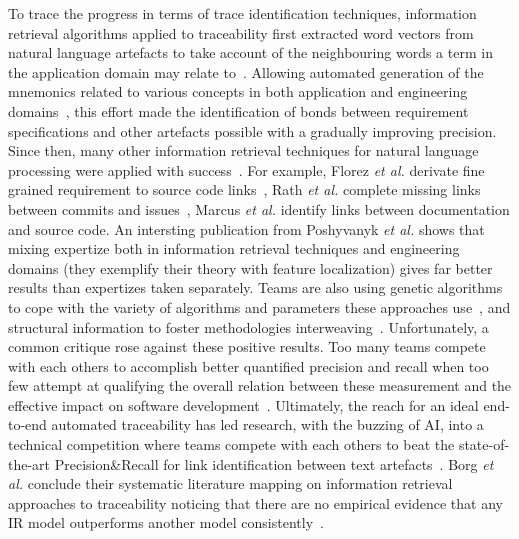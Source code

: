 To trace the progress in terms of trace identification techniques, information retrieval algorithms applied to traceability first extracted word vectors from natural language artefacts to take account of the neighbouring words a term in the application domain may relate to~\cite{delucia2012-information-retrieval-for-traceability}. Allowing automated generation of the mnemonics related to various concepts in both application and engineering domains~\cite{antoniol2002-tracing-code-documentation-links}, this effort made the identification of bonds between requirement specifications and other artefacts possible with a gradually improving precision. Since then, many other information retrieval techniques for natural language processing were applied with success~\cite{arunthavanathan2016-traceability-with-NLP}. For example, Florez \textit{et al.} derivate fine grained requirement to source code links~\cite{florez2019-finegrained-req2code}, Rath \textit{et al.} complete missing links between commits and issues~\cite{rath2018-guo-augmenting-incomplete-traces}, Marcus \textit{et al.} identify links between documentation and source code\cite{marcus2003-latent-semantic-indexing-for-traceability-LSI}. An intersting publication from Poshyvanyk \textit{et al.} shows that mixing expertize both in information retrieval techniques and engineering domains (they exemplify their theory with feature localization) gives far better results than expertizes taken separately.
Teams are also using genetic algorithms to cope with the variety of algorithms and parameters these approaches use~\cite{marcen2020-req2model-with-EA-ranking-train-system,panichella2013-genetic-programming-for-effective-topic-modeling}, and structural information to foster methodologies interweaving~\cite{panichella2013-using-structural-information-to-improve-IR-traceability}. Unfortunately, a common critique rose against these positive results. Too many teams compete with each others to accomplish better quantified precision and recall when too few attempt at qualifying the overall relation between these measurement and the effective impact on software development~\cite{clelandhuang2014-traceability-trends-and-futurte-direction}. 
Ultimately, the reach for an ideal end-to-end automated traceability has led research, with the buzzing of AI, into a technical competition where teams compete with each others to beat the state-of-the-art Precision\&Recall for link identification between text artefacts~\cite{shin2015-guidelines-benchmark-auto-traceability}. 
Borg \textit{et al.} conclude their systematic literature mapping on information retrieval approaches to traceability noticing that there are no empirical evidence that any IR model outperforms another model consistently~\cite{borg2014-SmS-IR-for-traceability}. 

